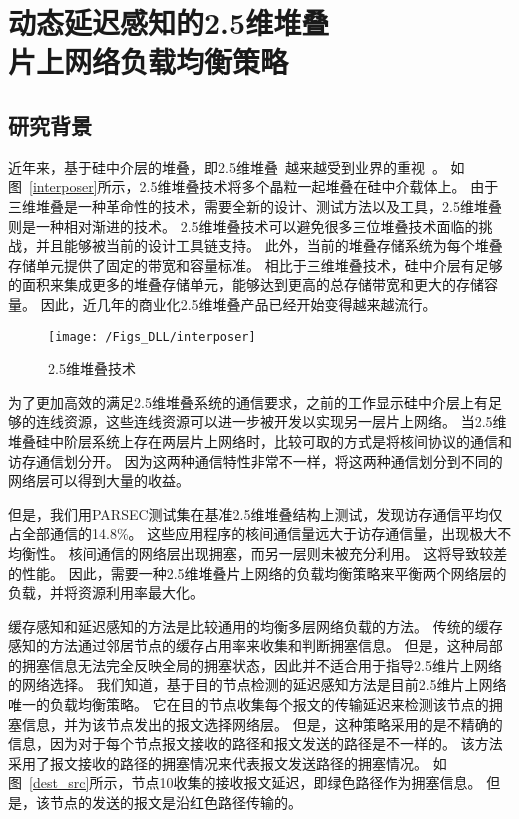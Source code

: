 \chapter{动态延迟感知的2.5维堆叠\\片上网络负载均衡策略}
\label{chap:DLL}

\section{研究背景}

近年来，基于硅中介层的堆叠，即2.5维堆叠~\cite{deng2001interconnect}越来越受到业界的重视~\cite{loh2015interconnect}。
如图~\ref{interposer}所示，2.5维堆叠技术将多个晶粒一起堆叠在硅中介载体上。
由于三维堆叠是一种革命性的技术，需要全新的设计、测试方法以及工具，2.5维堆叠则是一种相对渐进的技术。
2.5维堆叠技术可以避免很多三位堆叠技术面临的挑战，并且能够被当前的设计工具链支持。
此外，当前的堆叠存储系统为每个堆叠存储单元提供了固定的带宽和容量标准。
相比于三维堆叠技术，硅中介层有足够的面积来集成更多的堆叠存储单元，能够达到更高的总存储带宽和更大的存储容量。
因此，近几年的商业化2.5维堆叠产品已经开始变得越来越流行。

\begin{figure}[htbp] %
  \centering
  \texttt{[image: /Figs\_DLL/interposer]}
  \caption{2.5维堆叠技术}
  \label{fig:interposer}
\end{figure}

为了更加高效的满足2.5维堆叠系统的通信要求，之前的工作显示硅中介层上有足够的连线资源，这些连线资源可以进一步被开发以实现另一层片上网络。
当2.5维堆叠硅中阶层系统上存在两层片上网络时，比较可取的方式是将核间协议的通信和访存通信划分开。
因为这两种通信特性非常不一样，将这两种通信划分到不同的网络层可以得到大量的收益。

但是，我们用PARSEC测试集在基准2.5维堆叠结构上测试，发现访存通信平均仅占全部通信的14.8\%。
这些应用程序的核间通信量远大于访存通信量，出现极大不均衡性。
核间通信的网络层出现拥塞，而另一层则未被充分利用。
这将导致较差的性能。
因此，需要一种2.5维堆叠片上网络的负载均衡策略来平衡两个网络层的负载，并将资源利用率最大化。

缓存感知和延迟感知的方法是比较通用的均衡多层网络负载的方法。
传统的缓存感知的方法通过邻居节点的缓存占用率来收集和判断拥塞信息。
但是，这种局部的拥塞信息无法完全反映全局的拥塞状态，因此并不适合用于指导2.5维片上网络的网络选择。
我们知道，基于目的节点检测的延迟感知方法是目前2.5维片上网络唯一的负载均衡策略。
它在目的节点收集每个报文的传输延迟来检测该节点的拥塞信息，并为该节点发出的报文选择网络层。
但是，这种策略采用的是不精确的信息，因为对于每个节点报文接收的路径和报文发送的路径是不一样的。
该方法采用了报文接收的路径的拥塞情况来代表报文发送路径的拥塞情况。
如图~\ref{dest_src}所示，节点10收集的接收报文延迟，即绿色路径作为拥塞信息。
但是，该节点的发送的报文是沿红色路径传输的。

